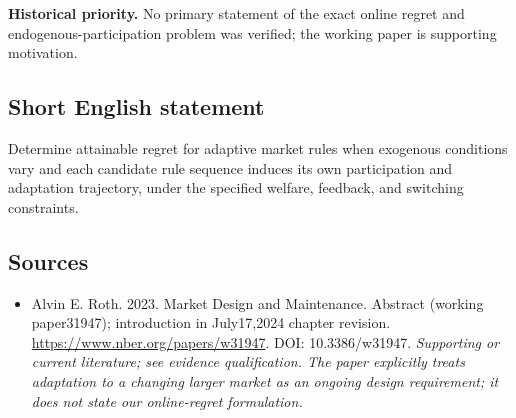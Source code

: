 \documentclass[11pt]{article}
\begin{document}
\par\textbf{Historical priority.} No primary statement of the exact online regret and endogenous-participation problem was verified; the working paper is supporting motivation.

\subsection{Short English statement}
Determine attainable regret for adaptive market rules when exogenous conditions vary and each candidate rule sequence induces its own participation and adaptation trajectory, under the specified welfare, feedback, and switching constraints.

\subsection{Sources}
\begin{itemize}\raggedright
\item[\textnormal{[S1]}]\hypertarget{source:30007581:1}{} Alvin E. Roth. 2023. Market Design and Maintenance. Abstract (working paper31947); introduction in July17,2024 chapter revision.
\url{https://www.nber.org/papers/w31947}.
DOI: 10.3386/w31947.
{\small\textit{Supporting or current literature; see evidence qualification. The paper explicitly treats adaptation to a changing larger market as an ongoing design requirement; it does not state our online-regret formulation.}}
\end{itemize}
\end{document}

